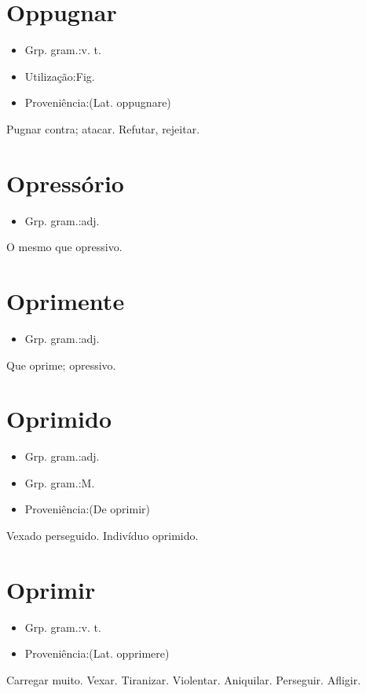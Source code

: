 \section{Oppugnar}
\begin{itemize}
\item {Grp. gram.:v. t.}
\end{itemize}
\begin{itemize}
\item {Utilização:Fig.}
\end{itemize}
\begin{itemize}
\item {Proveniência:(Lat. \textunderscore oppugnare\textunderscore )}
\end{itemize}
Pugnar contra; atacar.
Refutar, rejeitar.
\section{Opressório}
\begin{itemize}
\item {Grp. gram.:adj.}
\end{itemize}
O mesmo que \textunderscore opressivo\textunderscore .
\section{Oprimente}
\begin{itemize}
\item {Grp. gram.:adj.}
\end{itemize}
Que oprime; opressivo.
\section{Oprimido}
\begin{itemize}
\item {Grp. gram.:adj.}
\end{itemize}
\begin{itemize}
\item {Grp. gram.:M.}
\end{itemize}
\begin{itemize}
\item {Proveniência:(De \textunderscore oprimir\textunderscore )}
\end{itemize}
Vexado perseguido.
Indivíduo oprimido.
\section{Oprimir}
\begin{itemize}
\item {Grp. gram.:v. t.}
\end{itemize}
\begin{itemize}
\item {Proveniência:(Lat. \textunderscore opprimere\textunderscore )}
\end{itemize}
Carregar muito.
Vexar.
Tiranizar.
Violentar.
Aniquilar.
Perseguir.
Afligir.
